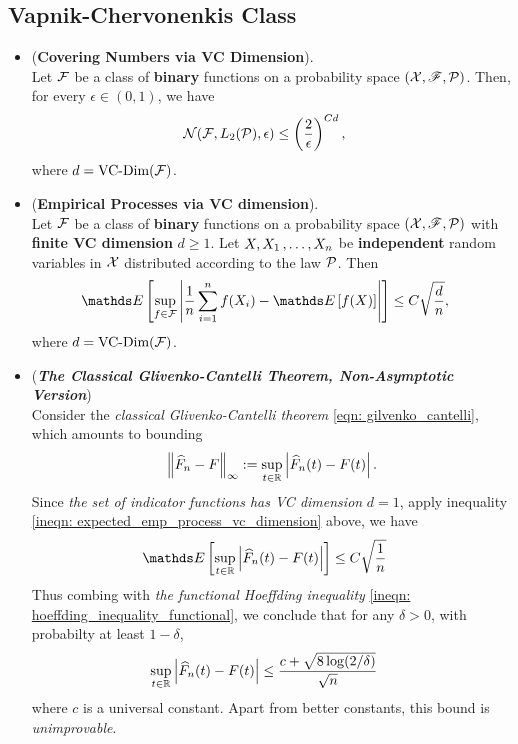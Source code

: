 \documentclass[11pt]{article}
\begin{document}
\subsection{Vapnik-Chervonenkis Class}
\begin{itemize}
\item \begin{theorem} (\textbf{Covering Numbers via VC Dimension}).  \citep{vershynin2018high}\\
Let ${\mathcal F}$ be a class of \textbf{binary} functions  on a probability space $({\mathcal X}, {\mathscr F}, {\mathcal P})$. Then, for every $\epsilon \in (0, 1)$, we
have
\begin{align}
{\mathcal N}({\mathcal F}, L_2({\mathcal P}), \epsilon) &\le \left(\frac{2}{\epsilon}\right)^{Cd}, \label{ineqn: covering_number_bound_vc_dimension}
\end{align} where $d = \text{VC-Dim}({\mathcal F})$.
\end{theorem}

\item  \begin{theorem} (\textbf{Empirical Processes via VC dimension}).  \citep{vershynin2018high}\\
Let ${\mathcal F}$ be a class of \textbf{binary} functions  on a probability space $({\mathcal X}, {\mathscr F}, {\mathcal P})$ with \textbf{finite VC dimension} $d \ge 1$. Let $X, X_1 \,{,}\ldots{,}\, X_n$ be \textbf{independent} random variables in ${\mathcal X}$ distributed according to the law ${\mathcal P}$. Then 
\begin{align}
\E{}{\sup_{f \in \cF}\abs{\frac{1}{n}\sum_{i=1}^{n}f(X_i) - \E{}{f(X)}}} &\le C\sqrt{\frac{d}{n}}, \label{ineqn: expected_emp_process_vc_dimension}
\end{align} where $d = \text{VC-Dim}({\mathcal F})$.
\end{theorem}


\item \begin{remark} (\textbf{\emph{The Classical Glivenko-Cantelli Theorem, Non-Asymptotic Version}})\\
Consider the \emph{classical Glivenko-Cantelli theorem} \eqref{eqn: gilvenko_cantelli}, which amounts to bounding
\begin{align*}
\left\|\widehat{F}_n - F\right\|_{\infty} :=  \sup_{t\in {\mathbb R}}\left\lvert \widehat{F}_n(t) - F(t) \right\rvert.
\end{align*}
Since \emph{the set of indicator functions has VC dimension} $d = 1$, apply inequality \eqref{ineqn: expected_emp_process_vc_dimension} above, we have
\begin{align}
\E{}{ \sup_{t\in \bR}\abs{\widehat{F}_n(t) - F(t)}} &\le C\sqrt{\frac{1}{n}} \label{ineqn: gilvenko_cantelli_expected_value}
\end{align} Thus combing with  \emph{the functional Hoeffding inequality} \eqref{ineqn: hoeffding_inequality_functional}, we conclude that for any $\delta >0$, with probabilty at least $1-\delta$, 
\begin{align}
 \sup_{t\in {\mathbb R}}\left\lvert \widehat{F}_n(t) - F(t) \right\rvert &\le  \frac{c + \sqrt{8 \log(2/\delta)}}{\sqrt{n}}  \label{ineqn: gilvenko_cantelli}
\end{align} where $c$ is a universal constant. Apart from better constants, this bound is \emph{unimprovable}.
\end{remark}
\end{itemize}
\end{document}
